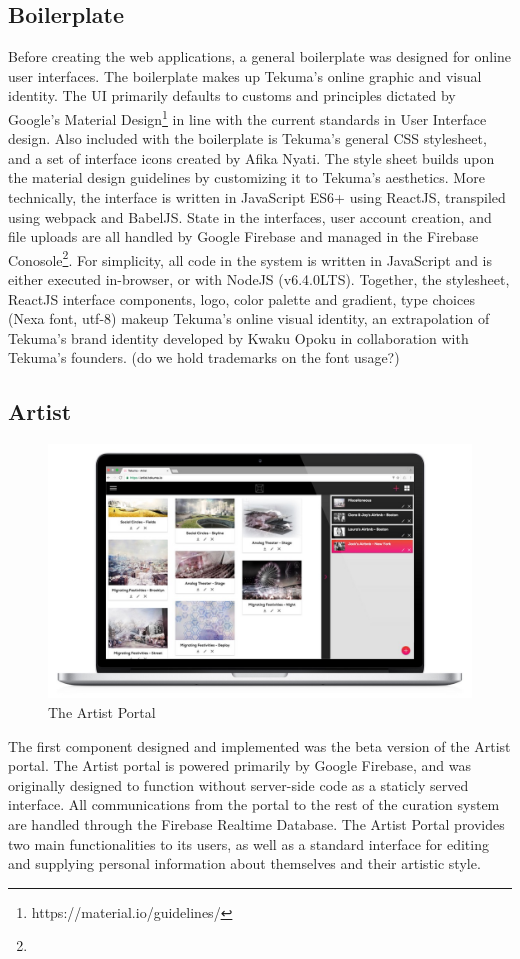 \documentclass[fontsize=12pt]{scrartcl} %
\numberwithin{equation}{section} %
\numberwithin{figure}{section} %
\numberwithin{table}{section} %
\begin{document}
\subsection{Boilerplate}
Before creating the web applications, a general boilerplate was designed for online user interfaces. The boilerplate makes up Tekuma’s online graphic and visual identity. The UI primarily defaults to customs and principles dictated by Google’s Material Design\footnote{ https://material.io/guidelines/ } in line with the current standards in User Interface design. Also included with the boilerplate is Tekuma’s general CSS stylesheet, and a set of interface icons created by Afika Nyati. The style sheet builds upon the material design guidelines by customizing it to Tekuma’s aesthetics. More technically, the interface is written in JavaScript ES6+ using ReactJS, transpiled using webpack and BabelJS. State in the interfaces, user account creation, and file uploads are all handled by Google Firebase and managed in the Firebase Conosole\footnote{}. For simplicity, all code in the system is written in JavaScript and is either executed in-browser, or with NodeJS (v6.4.0LTS). Together, the stylesheet, ReactJS interface components, logo, color palette and gradient, type choices (Nexa font, utf-8) makeup Tekuma’s online visual identity, an extrapolation of Tekuma’s brand identity developed by Kwaku Opoku in collaboration with Tekuma’s founders. (do we hold trademarks on the font usage?)


\subsection{Artist}
\begin{figure}
    \includegraphics[scale=0.2]{./img/artist.jpg}
    \caption{The Artist Portal}
    \label{}
\end{figure}
The first component designed and implemented was the beta version of the Artist portal. The Artist portal is powered primarily by Google Firebase, and was originally designed to function without server-side code as a staticly served interface. All communications from the portal to the rest of the curation system are handled through the Firebase Realtime Database. The Artist Portal provides two main functionalities to its users, as well as a standard interface for editing and supplying personal information about themselves and their artistic style.\\
\end{document}
